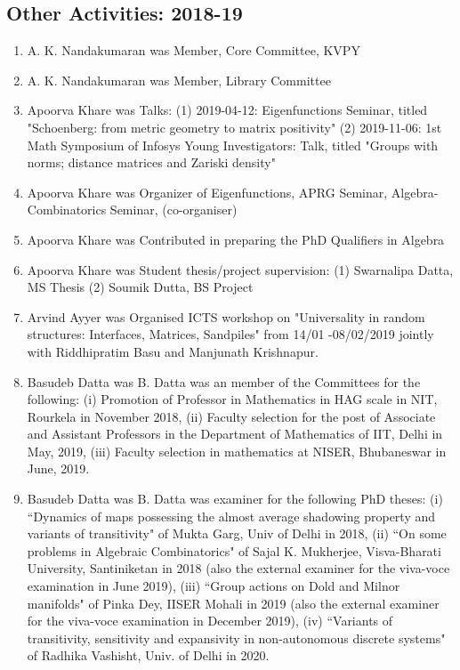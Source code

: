 \subsection{Other Activities: 2018-19}
\begin{enumerate}
\item A. K. Nandakumaran was Member, Core Committee, KVPY
\item A. K. Nandakumaran was Member, Library Committee
\item Apoorva Khare was Talks: (1) 2019-04-12: Eigenfunctions Seminar, titled "Schoenberg: from metric geometry to matrix positivity" (2) 2019-11-06: 1st Math Symposium of Infosys Young Investigators: Talk, titled "Groups with norms; distance matrices and Zariski density"
\item Apoorva Khare was Organizer of Eigenfunctions,  APRG Seminar, Algebra-Combinatorics Seminar, (co-organiser)
\item Apoorva Khare was Contributed in preparing the PhD Qualifiers in Algebra
\item Apoorva Khare was Student thesis/project supervision: (1) Swarnalipa Datta, MS Thesis (2) Soumik Dutta, BS Project
\item Arvind Ayyer was Organised ICTS workshop on "Universality in random structures: Interfaces, Matrices, Sandpiles" from 14/01 -08/02/2019 jointly with Riddhipratim Basu and Manjunath Krishnapur.
\item Basudeb Datta was B. Datta was an member of the Committees for the following: (i)  Promotion of Professor in Mathematics in HAG scale in NIT, Rourkela in November 2018, (ii) Faculty selection for the post of Associate and Assistant Professors in the Department of Mathematics of IIT, Delhi in May, 2019, (iii) Faculty selection in mathematics at NISER, Bhubaneswar in June, 2019.
\item Basudeb Datta was B. Datta was  examiner for the following PhD theses:  (i) ``Dynamics of maps possessing the almost average shadowing property and variants of transitivity" of Mukta Garg, Univ of Delhi in 2018, (ii) ``On some problems in Algebraic Combinatorics" of Sajal K. Mukherjee, Visva-Bharati University, Santiniketan in 2018 (also the external examiner for the viva-voce examination  in June 2019), (iii) ``Group actions on Dold and Milnor manifolds" of Pinka Dey, IISER Mohali in 2019 (also the external examiner for the viva-voce examination in December 2019), (iv) ``Variants of transitivity, sensitivity and expansivity in non-autonomous discrete systems" of Radhika Vashisht,  Univ. of Delhi in 2020.

\end{enumerate}
